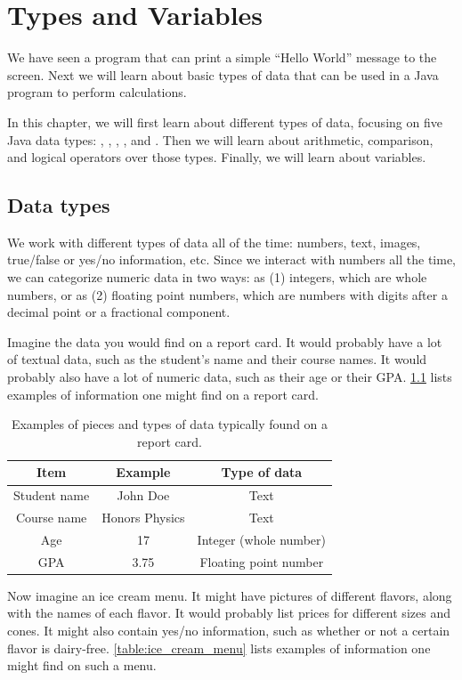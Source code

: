 \chapter{Types and Variables}

We have seen a program that can print a simple ``Hello World'' message to the screen. Next we will learn about basic types of data that can be used in a Java program to perform calculations.

In this chapter, we will first learn about different types of data, focusing on five Java data types: , , , , and . Then we will learn about arithmetic, comparison, and logical operators over those types. Finally, we will learn about variables.

\section{Data types}
We work with different types of data all of the time: numbers, text, images, true/false or yes/no information, etc. Since we interact with numbers all the time, we can categorize numeric data in two ways: as (1) integers, which are whole numbers, or as (2) floating point numbers, which are numbers with digits after a decimal point or a fractional component.

Imagine the data you would find on a report card. It would probably have a lot of textual data, such as the student's name and their course names. It would probably also have a lot of numeric data, such as their age or their GPA. \ref{table:report_card} lists examples of information one might find on a report card.

\begin{table}[h!]
\centering
\begin{tabular}{ |c|c|c| }
 \hline
 Item & Example & Type of data \\
 \hline
 \hline
 Student name & John Doe & Text \\
 Course name & Honors Physics & Text \\
 Age & 17 & Integer (whole number) \\
 GPA & 3.75 & Floating point number\\
 \hline
\end{tabular}
\caption{Examples of pieces and types of data typically found on a report card.}
\label{table:report_card}
\end{table}

Now imagine an ice cream menu. It might have pictures of different flavors, along with the names of each flavor. It would probably list prices for different sizes and cones. It might also contain yes/no information, such as whether or not a certain flavor is dairy-free. \autoref{table:ice_cream_menu} lists examples of information one might find on such a menu.

